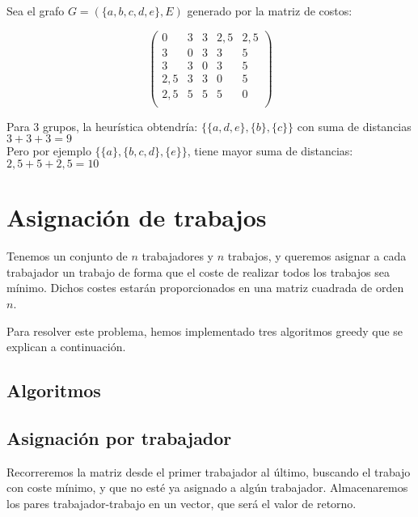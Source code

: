\documentclass[a4paper, 11pt]{article} %
\begin{document}
  Sea el grafo $G=(\{a,b,c,d,e\},E)$ generado por la matriz de costos:
  
  $$\begin{pmatrix}
     0 & 3 & 3 & 2,5 & 2,5\\
     3 & 0 & 3 & 3 & 5\\
     3 & 3 & 0 & 3 & 5\\
     2,5 & 3 & 3 & 0 & 5\\
     2,5 & 5 & 5 & 5 & 0\\
    \end{pmatrix}$$

    Para 3 grupos, la heurística obtendría: $\{\{a,d,e\},\{b\},\{c\}\}$ con suma de distancias $3+3+3=9$\\
    
    Pero por ejemplo $\{\{a\},\{b,c,d\},\{e\}\}$, tiene mayor suma de distancias: $2,5+5+2,5=10$

    
\section{Asignación de trabajos}
Tenemos un conjunto de $n$ trabajadores y $n$ trabajos, y queremos asignar a cada trabajador un trabajo de forma
que el coste de realizar todos los trabajos sea mínimo. Dichos costes estarán proporcionados en una matriz cuadrada
de orden $n$.

Para resolver este problema, hemos implementado tres algoritmos greedy que se explican a continuación. 
	\subsection{Algoritmos}
		\subsection{Asignación por trabajador}
		Recorreremos la matriz desde el primer trabajador al último, buscando el trabajo con coste mínimo, y que no esté ya 
		asignado a algún trabajador. Almacenaremos los pares trabajador-trabajo en un vector, que será el valor de retorno. 
		
\end{document}
